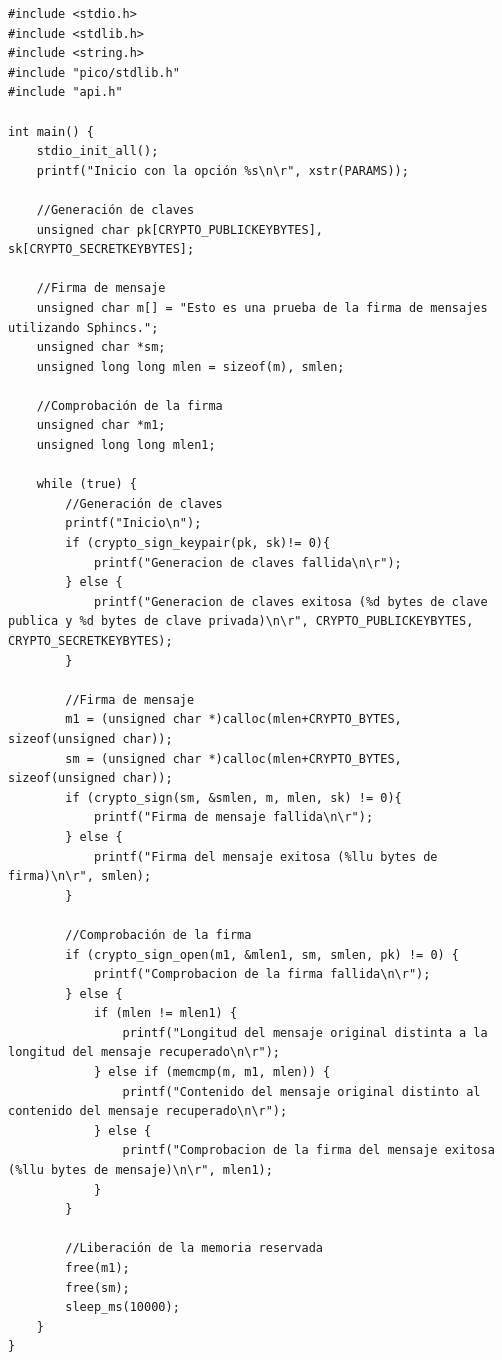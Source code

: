 \begin{lstlisting}[label={lst:sphincs-main},style=Cnice,firstnumber=1,caption={Archivo \texttt{Sphincs/main.c}.}]
#include <stdio.h>
#include <stdlib.h>
#include <string.h>
#include "pico/stdlib.h"
#include "api.h"

int main() {
    stdio_init_all();
    printf("Inicio con la opción %s\n\r", xstr(PARAMS));

    //Generación de claves
    unsigned char pk[CRYPTO_PUBLICKEYBYTES], sk[CRYPTO_SECRETKEYBYTES];

    //Firma de mensaje
    unsigned char m[] = "Esto es una prueba de la firma de mensajes utilizando Sphincs.";
    unsigned char *sm;
    unsigned long long mlen = sizeof(m), smlen;

    //Comprobación de la firma
    unsigned char *m1;
    unsigned long long mlen1;

    while (true) {
        //Generación de claves
        printf("Inicio\n");
        if (crypto_sign_keypair(pk, sk)!= 0){
            printf("Generacion de claves fallida\n\r");
        } else {
            printf("Generacion de claves exitosa (%d bytes de clave publica y %d bytes de clave privada)\n\r", CRYPTO_PUBLICKEYBYTES, CRYPTO_SECRETKEYBYTES);
        }

        //Firma de mensaje
        m1 = (unsigned char *)calloc(mlen+CRYPTO_BYTES, sizeof(unsigned char));
        sm = (unsigned char *)calloc(mlen+CRYPTO_BYTES, sizeof(unsigned char));
        if (crypto_sign(sm, &smlen, m, mlen, sk) != 0){
            printf("Firma de mensaje fallida\n\r");
        } else {
            printf("Firma del mensaje exitosa (%llu bytes de firma)\n\r", smlen);
        }

        //Comprobación de la firma
        if (crypto_sign_open(m1, &mlen1, sm, smlen, pk) != 0) {
            printf("Comprobacion de la firma fallida\n\r");
        } else {
            if (mlen != mlen1) {
                printf("Longitud del mensaje original distinta a la longitud del mensaje recuperado\n\r");
            } else if (memcmp(m, m1, mlen)) {
                printf("Contenido del mensaje original distinto al contenido del mensaje recuperado\n\r");
            } else {
                printf("Comprobacion de la firma del mensaje exitosa (%llu bytes de mensaje)\n\r", mlen1);
            }
        }

        //Liberación de la memoria reservada
        free(m1);
        free(sm);
        sleep_ms(10000);
    }
}
\end{lstlisting}


